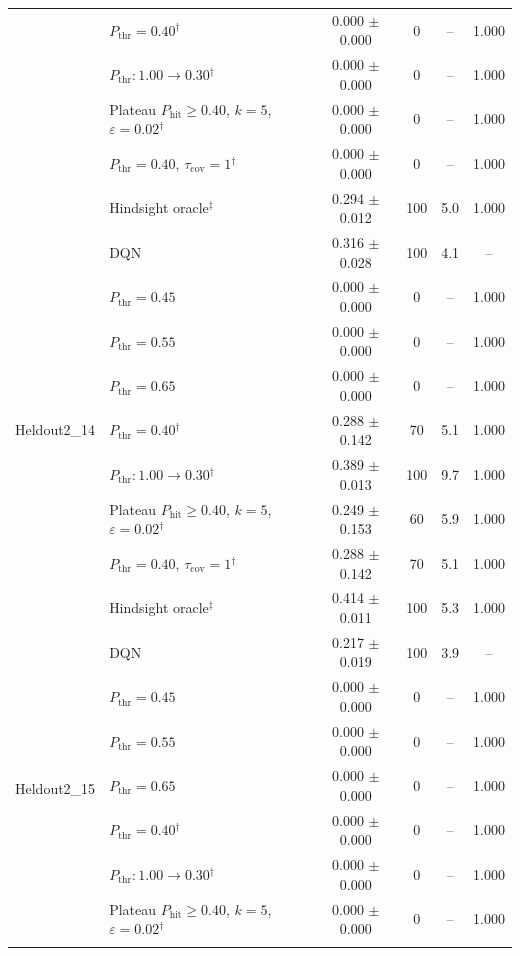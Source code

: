 \begin{table}[htbp]
\begin{tabular}{llcccc}
 & $P_{\mathrm{thr}}=0.40$$^{\dagger}$ & 0.000 $\pm$ 0.000 & 0 & -- & 1.000 \\
 & $P_{\mathrm{thr}}: 1.00 \to 0.30$$^{\dagger}$ & 0.000 $\pm$ 0.000 & 0 & -- & 1.000 \\
 & Plateau $P_{\mathrm{hit}}\geq0.40$, $k=5$, $\varepsilon=0.02$$^{\dagger}$ & 0.000 $\pm$ 0.000 & 0 & -- & 1.000 \\
 & $P_{\mathrm{thr}}=0.40$, $\tau_{\mathrm{cov}}=1$$^{\dagger}$ & 0.000 $\pm$ 0.000 & 0 & -- & 1.000 \\
 & Hindsight oracle$^{\ddagger}$ & 0.294 $\pm$ 0.012 & 100 & 5.0 & 1.000 \\
\midrule
\multirow{9}{*}{Heldout2\_14} & DQN & 0.316 $\pm$ 0.028 & 100 & 4.1 & -- \\
 & $P_{\mathrm{thr}}=0.45$ & 0.000 $\pm$ 0.000 & 0 & -- & 1.000 \\
 & $P_{\mathrm{thr}}=0.55$ & 0.000 $\pm$ 0.000 & 0 & -- & 1.000 \\
 & $P_{\mathrm{thr}}=0.65$ & 0.000 $\pm$ 0.000 & 0 & -- & 1.000 \\
 & $P_{\mathrm{thr}}=0.40$$^{\dagger}$ & 0.288 $\pm$ 0.142 & 70 & 5.1 & 1.000 \\
 & $P_{\mathrm{thr}}: 1.00 \to 0.30$$^{\dagger}$ & 0.389 $\pm$ 0.013 & 100 & 9.7 & 1.000 \\
 & Plateau $P_{\mathrm{hit}}\geq0.40$, $k=5$, $\varepsilon=0.02$$^{\dagger}$ & 0.249 $\pm$ 0.153 & 60 & 5.9 & 1.000 \\
 & $P_{\mathrm{thr}}=0.40$, $\tau_{\mathrm{cov}}=1$$^{\dagger}$ & 0.288 $\pm$ 0.142 & 70 & 5.1 & 1.000 \\
 & Hindsight oracle$^{\ddagger}$ & 0.414 $\pm$ 0.011 & 100 & 5.3 & 1.000 \\
\midrule
\multirow{9}{*}{Heldout2\_15} & DQN & 0.217 $\pm$ 0.019 & 100 & 3.9 & -- \\
 & $P_{\mathrm{thr}}=0.45$ & 0.000 $\pm$ 0.000 & 0 & -- & 1.000 \\
 & $P_{\mathrm{thr}}=0.55$ & 0.000 $\pm$ 0.000 & 0 & -- & 1.000 \\
 & $P_{\mathrm{thr}}=0.65$ & 0.000 $\pm$ 0.000 & 0 & -- & 1.000 \\
 & $P_{\mathrm{thr}}=0.40$$^{\dagger}$ & 0.000 $\pm$ 0.000 & 0 & -- & 1.000 \\
 & $P_{\mathrm{thr}}: 1.00 \to 0.30$$^{\dagger}$ & 0.000 $\pm$ 0.000 & 0 & -- & 1.000 \\
 & Plateau $P_{\mathrm{hit}}\geq0.40$, $k=5$, $\varepsilon=0.02$$^{\dagger}$ & 0.000 $\pm$ 0.000 & 0 & -- & 1.000 \\
$$
\end{tabular}
\end{table}
